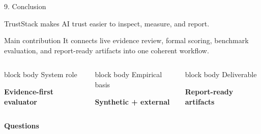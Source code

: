 \documentclass[aspectratio=169,11pt]{beamer}
\newcommand{\slidelead}[1]{%
  {\color{tsmuted}\footnotesize #1\par}
  \vspace{0.35em}
}
\newcommand{\statcard}[2]{%
  \begin{beamercolorbox}[wd=\linewidth,rounded=true,shadow=true,sep=0.18cm]{block body}
    {\scriptsize\textcolor{tsmuted}{#1}}\par
    \vspace{0.22em}
    {\large\bfseries #2}
  \end{beamercolorbox}
}
\begin{document}
\begin{frame}{9. Conclusion}
  \slidelead{TrustStack makes AI trust easier to inspect, measure, and report.}
  \begin{block}{Main contribution}
    It connects live evidence review, formal scoring, benchmark evaluation, and report-ready artifacts into one coherent workflow.
  \end{block}
  \vspace{0.6em}
  \begin{columns}[T,totalwidth=\textwidth]
    \statcard{System role}{Evidence-first evaluator}
    \statcard{Empirical basis}{Synthetic + external}
    \statcard{Deliverable}{Report-ready artifacts}
  \end{columns}
  \vspace{0.6em}
  \begin{center}
    {\large\bfseries Questions}
  \end{center}
\end{frame}
\end{document}
